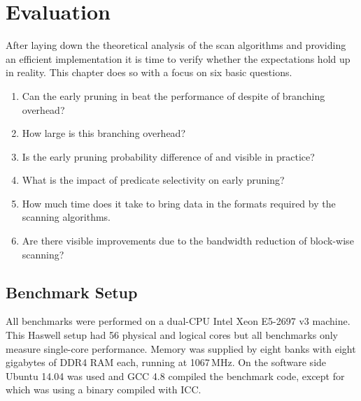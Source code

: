 \chapter{Evaluation}

After laying down the theoretical analysis of the scan algorithms and providing
an efficient implementation it is time to verify whether the expectations hold
up in reality. This chapter does so with a focus on six basic questions.

\begin{enumerate}
  \item Can the early pruning in \bwv{} beat the performance of \simdscan{}
despite of branching overhead?
  \item How large is this branching overhead?
  \item Is the early pruning probability difference of \bwv{} and \bs{} visible in practice?
  \item What is the impact of predicate selectivity on early pruning?
  \item How much time does it take to bring data in the formats required by the scanning algorithms.
  \item Are there visible improvements due to the bandwidth reduction of block-wise scanning?
\end{enumerate}

\section{Benchmark Setup}

All benchmarks were performed on a dual-CPU Intel Xeon E5-2697 v3 machine. This
Haswell setup had 56 physical and logical cores but all benchmarks only measure
single-core performance. Memory was supplied by eight banks with eight
gigabytes of DDR4 RAM each, running at 1067\,MHz. On the software side Ubuntu
14.04 was used and GCC 4.8 compiled the benchmark code, except for \simdscan{}
which was using a binary compiled with ICC.
